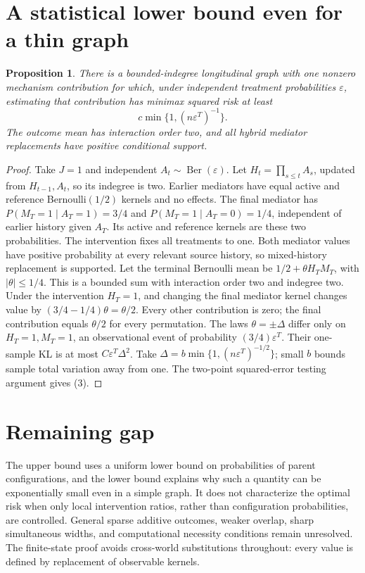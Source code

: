 \documentclass[11pt]{article}
\newtheorem{proposition}[theorem]{Proposition}
\theoremstyle{definition}
\begin{document}
\section*{A statistical lower bound even for a thin graph}
\begin{proposition}
There is a bounded-indegree longitudinal graph with one nonzero mechanism
contribution for which, under independent treatment probabilities
$\varepsilon$, estimating that contribution has minimax squared risk at least
\[
 c\min\{1,(n\varepsilon^T)^{-1}\}.                     \tag{3}
\]
The outcome mean has interaction order two, and all hybrid mediator
replacements have positive conditional support.
\end{proposition}
\begin{proof}
Take $J=1$ and independent $A_t\sim\operatorname{Ber}(\varepsilon)$.
Let $H_t=\prod_{s\le t}A_s$, updated from $H_{t-1},A_t$, so its indegree
is two. Earlier mediators have equal active and reference Bernoulli$(1/2)$
kernels and no effects. The final mediator has
$P(M_T=1\mid A_T=1)=3/4$ and
$P(M_T=1\mid A_T=0)=1/4$, independent of earlier history given $A_T$.
Its active and reference kernels are these two probabilities.
The intervention fixes all treatments to one. Both mediator values have
positive probability at every relevant source history, so mixed-history
replacement is supported. Let the terminal Bernoulli mean be
$1/2+\theta H_T M_T$, with $|\theta|\le1/4$.
This is a bounded sum with interaction order two and indegree two.
Under the intervention $H_T=1$, and changing the final mediator kernel
changes value by $(3/4-1/4)\theta=\theta/2$.
Every other contribution is zero; the final contribution equals $\theta/2$
for every permutation.
The laws $\theta=\pm\Delta$ differ only on $H_T=1,M_T=1$,
an observational event of probability $(3/4)\varepsilon^T$.
Their one-sample KL is at most $C\varepsilon^T\Delta^2$.
Take $\Delta=b\min\{1,(n\varepsilon^T)^{-1/2}\}$; small $b$ bounds
sample total variation away from one. The two-point squared-error testing
argument gives (3).
\end{proof}

\section*{Remaining gap}
The upper bound uses a uniform lower bound on probabilities of parent
configurations, and the lower bound explains why such a quantity can be
exponentially small even in a simple graph. It does not characterize the
optimal risk when only local intervention ratios, rather than configuration
probabilities, are controlled. General sparse additive outcomes, weaker
overlap, sharp simultaneous widths, and computational necessity conditions
remain unresolved. The finite-state proof avoids cross-world substitutions
throughout: every value is defined by replacement of observable kernels.
\end{document}
